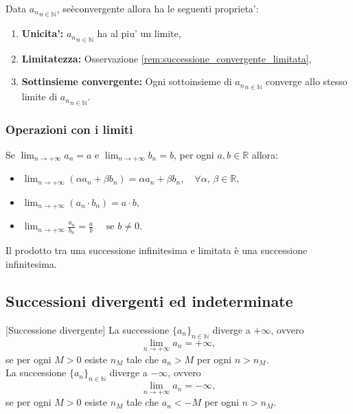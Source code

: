 \begin{proposition}
    Data ${a_n}_{n\in\mathbb N}$, seèconvergente allora ha le seguenti proprieta':
    \begin{enumerate}
        \item \textbf{Unicita':} ${a_n}_{n\in\mathbb N}$ ha al piu' un limite,
        \item \textbf{Limitatezza:} Osservazione \ref{rem:successione_convergente_limitata},
        \item \textbf{Sottinsieme convergente:} Ogni sottoinsieme di ${a_n}_{n\in\mathbb N}$ converge allo stesso limite di ${a_n}_{n\in\mathbb N}$.
    \end{enumerate}
\end{proposition}

\subsubsection{Operazioni con i limiti}

\begin{proposition}
    Se $\lim_{n\rightarrow+\infty}a_n=a$ e $\lim_{n\rightarrow+\infty}b_n=b$, per ogni $a,b\in\mathbb R$ allora:
    \begin{itemize}
        \item $\lim_{n\rightarrow+\infty}(\alpha a_n+\beta b_n)=\alpha a_n+\beta b_n,\quad \forall\alpha ,\,\beta\in\mathbb R,$
        \item $\lim_{n\rightarrow+\infty}(a_n\cdot b_n)=a\cdot b,$
        \item $\lim_{n\rightarrow+\infty}\frac{a_n}{b_n}=\frac{a}{b}\quad \text{ se } b\neq 0.$
    \end{itemize}
\end{proposition}

\begin{proposition}
    Il prodotto tra una successione infinitesima e limitata è una successione infinitesima.
\end{proposition}

\subsection{Successioni divergenti ed indeterminate}
\begin{definition}\label{def:successione_divergente}[Successione divergente]
    La successione $\{a_n\}_{n\in\mathbb N}$ diverge a $+\infty$, ovvero
    \begin{equation*}
        \lim_{n\rightarrow+\infty}a_n=+\infty,
    \end{equation*}
    se per ogni $M>0$ esiste $n_M$ tale che $a_n>M$ per ogni $n>n_M$.\\
    La successione $\{a_n\}_{n\in\mathbb N}$ diverge a $-\infty$, ovvero
    \begin{equation*}
        \lim_{n\rightarrow+\infty}a_n=-\infty,
    \end{equation*}
    se per ogni $M>0$ esiste $n_M$ tale che $a_n<-M$ per ogni $n>n_M$.    
\end{definition}

